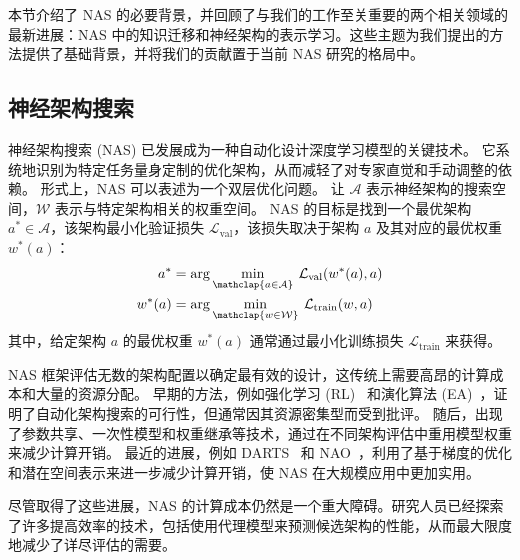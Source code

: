 \documentclass[../main_zh.tex]{subfiles}
\begin{document}
本节介绍了 NAS 的必要背景，并回顾了与我们的工作至关重要的两个相关领域的最新进展：NAS 中的知识迁移和神经架构的表示学习。这些主题为我们提出的方法提供了基础背景，并将我们的贡献置于当前 NAS 研究的格局中。

\subsection{神经架构搜索}

神经架构搜索 (NAS) 已发展成为一种自动化设计深度学习模型的关键技术。
它系统地识别为特定任务量身定制的优化架构，从而减轻了对专家直觉和手动调整的依赖。
形式上，NAS 可以表述为一个双层优化问题。
让 \( \mathcal{A} \) 表示神经架构的搜索空间，\( \mathcal{W} \) 表示与特定架构相关的权重空间。
NAS 的目标是找到一个最优架构 \( a^* \in \mathcal{A} \)，该架构最小化验证损失 \( \mathcal{L}_\mathrm{val} \)，该损失取决于架构 \( a \) 及其对应的最优权重 \( w^*(a) \)：
\begin{equation}
  \begin{aligned}
    a^*    & = \arg\min_{\mathclap{a \in \mathcal{A}}} \: \mathcal{L}_\mathrm{val}(w^*(a), a) \\
    w^*(a) & = \arg\min_{\mathclap{w \in \mathcal{W}}} \: \mathcal{L}_\mathrm{train}(w, a) \\
  \end{aligned}
\end{equation}
其中，给定架构 \( a \) 的最优权重 \( w^*(a) \) 通常通过最小化训练损失 \( \mathcal{L}_\mathrm{train} \) 来获得。

NAS 框架评估无数的架构配置以确定最有效的设计，这传统上需要高昂的计算成本和大量的资源分配。
早期的方法，例如强化学习 (RL)~\cite{DBLP:conf/iclr/ZophL17,DBLP:conf/cvpr/ZophVSL18,Gao2019GraphNASGN,Lyu2021MultiobjectiveRL,Hsu2018MONASMN} 和演化算法 (EA)~\cite{Liu2020ASO,DBLP:conf/aaai/RealAHL19,DBLP:journals/tec/ZhouQGT21,DBLP:conf/iconip/HouDFQ21,DBLP:journals/tnn/DongHFTTO23}，证明了自动化架构搜索的可行性，但通常因其资源密集型而受到批评。
随后，出现了参数共享、一次性模型和权重继承等技术，通过在不同架构评估中重用模型权重来减少计算开销。
最近的进展，例如 DARTS~\cite{DBLP:conf/iclr/LiuSY19} 和 NAO~\cite{DBLP:conf/nips/LuoTQCL18}，利用了基于梯度的优化和潜在空间表示来进一步减少计算开销，使 NAS 在大规模应用中更加实用。

尽管取得了这些进展，NAS 的计算成本仍然是一个重大障碍。研究人员已经探索了许多提高效率的技术，包括使用代理模型来预测候选架构的性能，从而最大限度地减少了详尽评估的需要。

\end{document}
